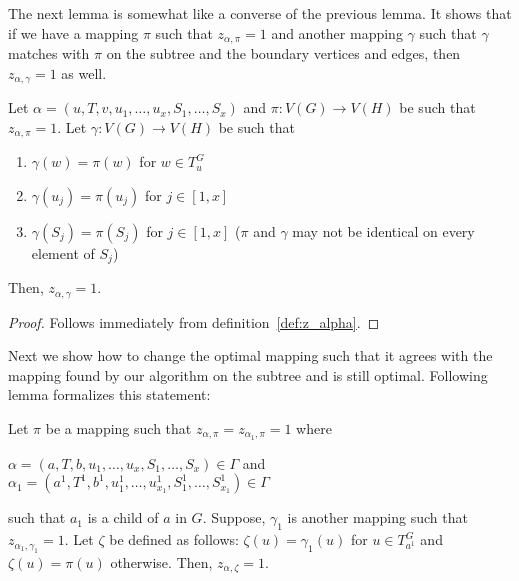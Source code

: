 The next lemma is somewhat like a converse of the previous lemma. It shows
that if we have a mapping $\pi$ such that $z_{\alpha,\pi} = 1$ and
another mapping $\gamma$ such that $\gamma$ matches with $\pi$ on the
subtree and the boundary vertices and edges, then
$z_{\alpha,\gamma} = 1$ as well.
%
\begin{lemma}\label{lem:changing_permutation} Let
  $\alpha = (u,T,v,u_1,\dots,u_x,S_1,\dots,S_x)$ and
  $\pi:V(G) \rightarrow V(H)$ be such that $z_{\alpha,\pi} = 1$. Let
  $\gamma:V(G) \rightarrow V(H)$ be such that
  \begin{enumerate}
  \item $\gamma(w) = \pi(w)$ for $w \in T_u^G$
  \item $\gamma(u_j) = \pi(u_j)$ for $j \in [1,x]$
  \item $\gamma(S_j) = \pi(S_j)$ for $j \in [1,x]$ ($\pi$ and $\gamma$
    may not be identical on every element of $S_j$)
  \end{enumerate}
  Then, $z_{\alpha,\gamma} = 1$.
\end{lemma}
%
\begin{proof}
  Follows immediately from
  definition~\ref{def:z_alpha}.
\end{proof}
%
Next we show how to change the optimal mapping such that it agrees
with the mapping found by our algorithm on the subtree and is still
optimal. Following lemma formalizes this statement:
%
\begin{lemma}\label{lem:combining_two_permutations}
  Let $\pi$ be a mapping such that
  $z_{\alpha,\pi}=z_{\alpha_1,\pi} = 1$ where
  \begin{center}
  $\alpha = (a,T,b,u_1,\dots,u_x,S_1,\dots,S_x) \in \Gamma$ and   $\alpha_1 =
  (a^1,T^1,b^1,u^1_1,\dots,u_{x_1}^1,S_1^1,\dots,S_{x_1}^1) \in
  \Gamma$
  \end{center}
 such that $a_1$ is a child of $a$ in $G$. Suppose,
  $\gamma_1$ is another mapping such that $z_{\alpha_1,\gamma_1} = 1$.
  Let $\zeta$ be defined as follows: $\zeta(u) = \gamma_1(u)$ for
  $u \in T_{a^1}^G$ and $\zeta(u) = \pi(u)$ otherwise. Then,
  $z_{\alpha,\zeta} = 1$.
\end{lemma}
%
